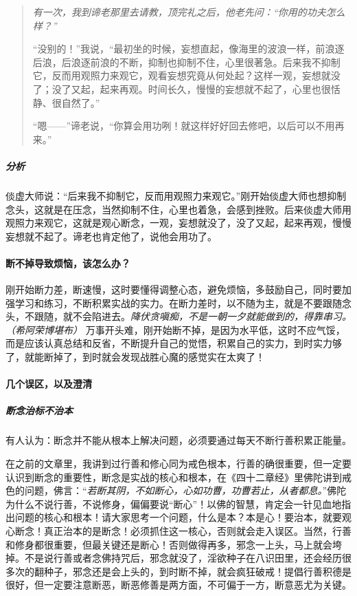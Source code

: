\begin{quotation}\it
    有一次，我到谛老那里去请教，顶完礼之后，他老先问：“你用的功夫怎么样？”

    “没别的！”我说，“最初坐的时候，妄想直起，像海里的波浪一样，前浪逐后浪，后浪逐前浪的不断，抑制也抑制不住，心里很著急。后来我不抑制它，反而用观照力来观它，观看妄想究竟从何处起？这样一观，妄想就没了；没了又起，起来再观。时间长久，慢慢的妄想就不起了，心里也很恬静、很自然了。”

    “嗯——”谛老说，“你算会用功咧！就这样好好回去修吧，以后可以不用再来。”
\end{quotation}

\subparagraph{分析} 倓虚大师说：“后来我不抑制它，反而用观照力来观它。”刚开始倓虚大师也想抑制念头，这就是在压念，当然抑制不住，心里也着急，会感到挫败。后来倓虚大师用观照力来观它，这就是观心断念，一观，妄想就没了，没了又起，起来再观，慢慢妄想就不起了。谛老也肯定他了，说他会用功了。

\paragraph{断不掉导致烦恼，该怎么办？}

刚开始断力差，断速慢，这时要懂得调整心态，避免烦恼，多鼓励自己，同时要加强学习和练习，不断积累实战的实力。在断力差时，以不随为主，就是不要跟随念头，不跟随，就不会陷进去。\textit{降伏贪嗔痴，不是一朝一夕就能做到的，得靠串习。（希阿荣博堪布）} 万事开头难，刚开始断不掉，是因为水平低，这时不应气馁，而是应该认真总结和反省，不断提升自己的觉悟，积累自己的实力，到时实力够了，就能断掉了，到时就会发现战胜心魔的感觉实在太爽了！

\paragraph{几个误区，以及澄清}

\subparagraph{断念治标不治本}

有人认为：断念并不能从根本上解决问题，必须要通过每天不断行善积累正能量。

在之前的文章里，我讲到过行善和修心同为戒色根本，行善的确很重要，但一定要认识到断念的重要性，断念是实战的核心和根本，在《四十二章经》里佛陀讲到戒色的问题，佛言：“\textit{若断其阴，不如断心，心如功曹，功曹若止，从者都息。}”佛陀为什么不说行善，不说修身，偏偏要说“断心”！以佛的智慧，肯定会一针见血地指出问题的核心和根本！请大家思考一个问题，什么是本？本是心！要治本，就要观心断念！真正治本的是断念！必须抓住这一核心，否则就会走入误区。当然，行善和修身都很重要，但最关键还是断心！否则做得再多，邪念一上头，马上就会垮掉。不是说行善或者念佛持咒后，邪念就没了，淫欲种子在八识田里，还会经历很多次的翻种子，邪念还是会上头的，到时断不掉，就会疯狂破戒！提倡行善积德是很好，但一定要注意断恶，断恶修善是两方面，不可偏于一方，断意恶尤为关键。

